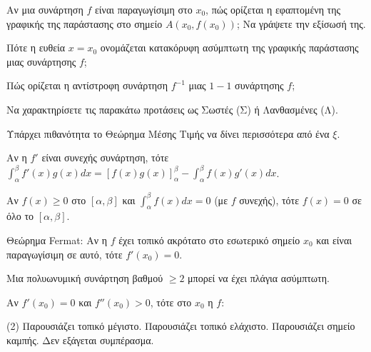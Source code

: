\documentclass[11pt,a4paper]{article}
\newcommand{\kerkissans}[1]{{\fontfamily{maksf}\selectfont \textbf{#1}}}
\renewcommand{\textdexiakeraia}{}
\newcommand{\dint}{\displaystyle\int}
\newcommand\themanum{A}
\newcounter{thema}[section]
\renewcommand{\thethema}{\arabic{thema}}
\newcommand{\Thema}{\refstepcounter{thema}{\textbf{\textcolor{black}{\faPenSquare\ \  \large \kerkissans{\textbf{\thethemaο\hspace{2mm}Διαγώνισμα - Θέμα \themanum}}}}}\hspace{0mm}}{}
\newenvironment{thema}[1]
{\begin{tcolorbox}[title=\Thema\kerkissans{\textbf{\large{  #1}}},breakable,
enhanced standard,titlerule=0pt,toprule=0pt, rightrule=0pt, bottomrule=0pt,
colback=white,left=0mm,top=1mm,bottom=0mm,
boxrule=0pt,
colframe=white,leftrule=0mm,sharp corners,coltitle=black]
\renewcommand{\themanum}{#1}}
{\end{tcolorbox}}
\newcommand{\eng}[1]{\selectlanguage{english}#1\selectlanguage{greek}}
\begin{document}
\begin{thema}{A}
\begin{erwthma}
    \item Αν μια συνάρτηση $f$ είναι παραγωγίσιμη στο $x_0$, πώς ορίζεται η εφαπτομένη της γραφικής της παράστασης στο σημείο $A(x_0, f(x_0))$; Να γράψετε την εξίσωσή της.
    \item Πότε η ευθεία $x=x_0$ ονομάζεται κατακόρυφη ασύμπτωτη της γραφικής παράστασης μιας συνάρτησης $f$;
    \item Πώς ορίζεται η αντίστροφη συνάρτηση $f^{-1}$ μιας $1-1$ συνάρτησης $f$;
    \item Να χαρακτηρίσετε τις παρακάτω προτάσεις ως Σωστές (Σ) ή Λανθασμένες (Λ).
    \begin{alist}
        \item Υπάρχει πιθανότητα το Θεώρημα Μέσης Τιμής να δίνει περισσότερα από ένα $\xi$.
        \item Αν η $f'$ είναι συνεχής συνάρτηση, τότε $\dint_{\alpha}^{\beta} f'(x)g(x)dx = [f(x)g(x)]_{\alpha}^{\beta} - \dint_{\alpha}^{\beta} f(x)g'(x)dx$.
        \item Αν $f(x) \ge 0$ στο $[\alpha, \beta]$ και $\dint_\alpha^\beta f(x)dx = 0$ (με $f$ συνεχής), τότε $f(x) = 0$ σε όλο το $[\alpha, \beta]$.
        \item Θεώρημα \eng{Fermat}: Αν η $f$ έχει τοπικό ακρότατο στο εσωτερικό σημείο $x_0$ και είναι παραγωγίσιμη σε αυτό, τότε $f'(x_0) = 0$.
        \item Μια πολυωνυμική συνάρτηση βαθμού $\ge 2$ μπορεί να έχει πλάγια ασύμπτωτη.
    \end{alist}
    \item Αν $f'(x_0) = 0$ και $f''(x_0) > 0$, τότε στο $x_0$ η $f$:
    \begin{tasks}[label=\let\textdexiakeraia\relax\alph*.](2)
        \task Παρουσιάζει τοπικό μέγιστο.
        \task Παρουσιάζει τοπικό ελάχιστο.
        \task Παρουσιάζει σημείο καμπής.
        \task Δεν εξάγεται συμπέρασμα.
    \end{tasks}
\end{erwthma}
\end{thema}
\vspace{1cm}
\end{document}

